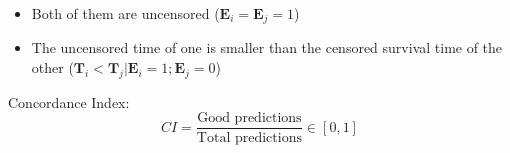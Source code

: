 \begin{frame}
  \begin{itemize}
    \item Both of them are uncensored (\( \bm{E}_i = \bm{E}_j = 1\))
    \item The uncensored time of one is smaller than the censored survival time of the other
    (\( \bm{T}_i < \bm{T}_j | \bm{E}_i = 1; \bm{E}_j = 0 \))
  \end{itemize}

  Concordance Index:
  \[
    CI = \frac{\text{Good predictions}}{\text{Total predictions}} \in [0, 1]
  \]
\end{frame}
